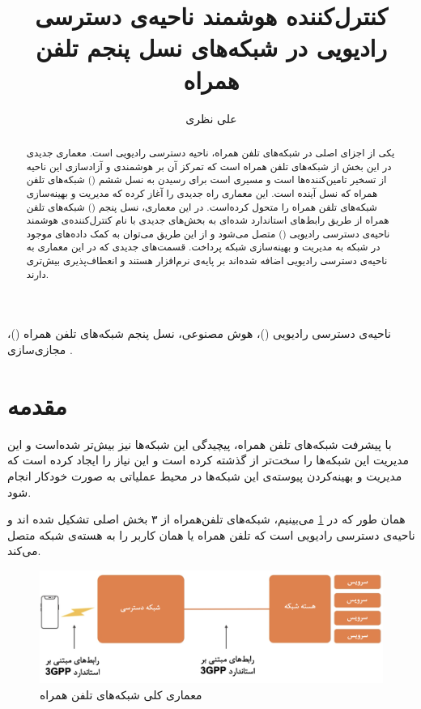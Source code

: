 \documentclass{CSICC}
\title{
کنترل‌کننده هوشمند ناحیه‌ی دسترسی رادیویی
\lr{(RIC)}
 در شبکه‌های نسل پنجم تلفن همراه
}
\date{}
\author[1]{علی نظری}
\affil[1]{
 دانشگاه علم و صنعت ایران، دانشکده‌ی مهندسی کامپیوتر،
 \lr{nazari\_a17@comp.iust.ac.ir}
}
\begin{document}
\maketitle
\begin{abstract}
یکی از اجزای اصلی در شبکه‌های تلفن همراه، ناحیه دسترسی رادیویی است. 
معماری جدیدی در این بخش از شبکه‌های تلفن همراه است که تمرکز آن بر هوشمندی و آزادسازی این ناحیه از تسخیر تامین‌کننده‌ها
است و مسیری است برای رسیدن به نسل‌ ششم 
()
شبکه‌های تلفن همراه که نسل آینده است. این معماری راه جدیدی را آغاز کرده که مدیریت و بهینه‌سازی شبکه‌های تلفن همراه را متحول کرده‌است. 
در این معماری، نسل پنجم 
()
شبکه‌های تلفن همراه از طریق رابط‌های
 استاندارد شده‌ای به بخش‌های جدیدی با نام کنترل‌کننده‌ی هوشمند ناحیه‌ی دسترسی رادیویی
()
متصل می‌شود و از این طریق می‌توان به کمک داده‌های موجود در شبکه به مدیریت و بهینه‌سازی شبکه پرداخت. قسمت‌های جدیدی که در این معماری به ناحیه‌ی دسترسی رادیویی اضافه شده‌اند بر پایه‌ی نرم‌افزار هستند و انعطاف‌پذیری بیش‌تری دارند.

 \end{abstract}
\begin{keywords}
ناحیه‌ی دسترسی رادیویی
()، 
هوش مصنوعی، 
نسل پنجم شبکه‌های تلفن همراه
()،
مجازی‌سازی
. 
\end{keywords}

\section{مقدمه}

با پیشرفت شبکه‌های تلفن همراه، پیچیدگی این شبکه‌ها نیز بیش‌تر شده‌است و این مدیریت این شبکه‌ها را سخت‌تر از گذشته کرده ‌است و این نیاز را ایجاد کرده ‌است که مدیریت و بهینه‌کردن پیوسته‌ی این شبکه‌ها در محیط عملیاتی به صورت خودکار انجام شود. 

همان طور که در 
\ref{fig:ran}
می‌بینیم، شبکه‌های تلفن‌همراه از ۳ بخش اصلی تشکیل شده اند و ناحیه‌ی دسترسی رادیویی
 است که تلفن همراه یا همان کاربر 
 را به هسته‌ی
  شبکه متصل می‌کند.
\begin{figure}[H]
	\includegraphics[width=\columnwidth]{Images/ran.png}
	\centering
	\caption{معماری کلی شبکه‌های تلفن همراه}
	\label{fig:ran}
\end{figure}
\end{document}
